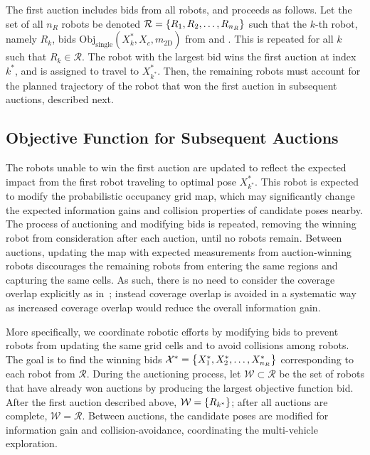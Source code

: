 The first auction includes bids from all robots, and proceeds as follows. Let the set of all $n_R$ robots be denoted $\mathcal R=\left\{ R_1,R_2,\dots,R_{n_R} \right\}$ such that the $k$-th robot, namely $R_k$, bids $\text{Obj}_\text{single}(X^*_k,X_c,m_\text{2D})$ from  and . This is repeated for all $k$ such that $R_k\in\mathcal R$. The robot with the largest bid wins the first auction at index $k^*$, and is assigned to travel to $X^*_{k^*}$. Then, the remaining robots must account for the planned trajectory of the robot that won the first auction in subsequent auctions, described next.



\subsection{Objective Function for Subsequent Auctions}

The robots unable to win the first auction are updated to reflect the expected impact from the first robot traveling to optimal pose $X^*_{k^*}$.
This robot is expected to modify the probabilistic occupancy grid map, which may significantly change the expected information gains and collision properties of candidate poses nearby. The process of auctioning and modifying bids is repeated, removing the winning robot from consideration after each auction, until no robots remain. Between auctions, updating the map with expected measurements from auction-winning robots discourages the remaining robots from entering the same regions and capturing the same cells. As such, there is no need to consider the coverage overlap explicitly as in~\cite{SimApfBurFoxMooThrYou00}; instead coverage overlap is avoided in a systematic way as increased coverage overlap would reduce the overall information gain.

More specifically, we coordinate robotic efforts by modifying bids to prevent robots from updating the same grid cells and to avoid collisions among robots. The goal is to find the winning bids $\mathcal X^*=\left\{ X^*_{1},X^*_{2},\dots,X^*_{n_R} \right\}$ corresponding to each robot from $\mathcal R$. During the auctioning process, let $\mathcal W\subset\mathcal R$ be the set of robots that have already won auctions by producing the largest objective function bid. After the first auction described above, $\mathcal W=\left\{ R_{k^*} \right\}$; after all auctions are complete, $\mathcal W=\mathcal R$. Between auctions, the candidate poses are modified for information gain and collision-avoidance, coordinating the multi-vehicle exploration.

